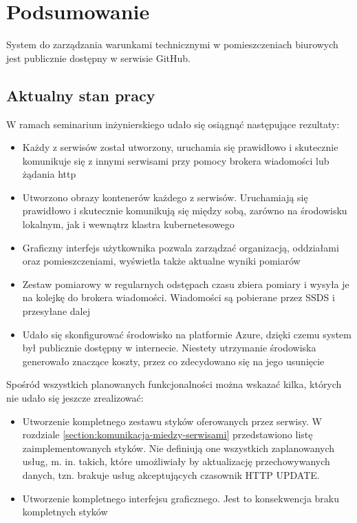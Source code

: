 \newpage
\section{Podsumowanie}

System do zarządzania warunkami technicznymi w pomieszczeniach biurowych jest publicznie
dostępny w serwisie GitHub\cite{github2022}.

\subsection{Aktualny stan pracy}
\label{subsection:aktualny-stan-pracy}

W ramach seminarium inżynierskiego udało się osiągnąć następujące rezultaty:

\begin{itemize}
    \item Każdy z serwisów został utworzony, uruchamia się prawidłowo i skutecznie
    komunikuje się z innymi serwisami przy pomocy brokera wiadomości lub
    żądania http
    \item Utworzono obrazy kontenerów każdego z serwisów. Uruchamiają się prawidłowo
    i skutecznie komunikują się między sobą, zarówno na środowisku lokalnym, jak
    i wewnątrz klastra kubernetesowego
    \item Graficzny interfejs użytkownika pozwala zarządzać organizacją, oddziałami
    oraz pomieszczeniami, wyświetla także aktualne wyniki pomiarów
    \item Zestaw pomiarowy w regularnych odstępach czasu zbiera pomiary i wysyła je 
    na kolejkę do brokera wiadomości. Wiadomości są pobierane przez SSDS i przesyłane 
    dalej
    \item Udało się skonfigurować środowisko na platformie Azure, dzięki czemu system
    był publicznie dostępny w internecie. Niestety utrzymanie środowiska generowało
    znaczące koszty, przez co zdecydowano się na jego usunięcie
\end{itemize}

Spośród wszystkich planowanych funkcjonalności można wskazać kilka, których nie udało się
jeszcze zrealizować:

\begin{itemize}
    \item Utworzenie kompletnego zestawu styków oferowanych przez serwisy. W rozdziale
    \ref{section:komunikacja-miedzy-serwisami} przedstawiono listę zaimplementowanych 
    styków. Nie definiują one wszystkich zaplanowanych usług, m. in. takich, które umożliwiały by aktualizację przechowywanych
    danych, tzn. brakuje usług akceptujących czasownik HTTP UPDATE.
    \item Utworzenie kompletnego interfejsu graficznego. Jest to konsekwencja braku
    kompletnych styków
\end{itemize}

